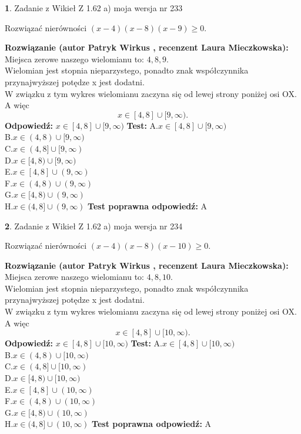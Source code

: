 \documentclass[12pt, a4paper]{article}
\theoremstyle{definition} %
\newtheorem{zad}{}
\newcommand{\zadStart}[1]{\begin{zad}#1\newline}
\newcommand{\zadStop}{\end{zad}}
\newcommand{\rozwStart}[2]{\noindent \textbf{Rozwiązanie (autor #1 , recenzent #2): }\newline}
\newcommand{\rozwStop}{\newline}
\newcommand{\odpStart}{\noindent \textbf{Odpowiedź:}\newline}
\newcommand{\odpStop}{\newline}
\newcommand{\testStart}{\noindent \textbf{Test:}\newline}
\newcommand{\testStop}{\newline}
\newcommand{\kluczStart}{\noindent \textbf{Test poprawna odpowiedź:}\newline}
\newcommand{\kluczStop}{\newline}
\begin{document}
\zadStart{Zadanie z Wikieł Z 1.62 a) moja wersja nr 233}

Rozwiązać nierówności $(x-4)(x-8)(x-9)\ge0$.
\zadStop
\rozwStart{Patryk Wirkus}{Laura Mieczkowska}
Miejsca zerowe naszego wielomianu to: $4, 8, 9$.\\
Wielomian jest stopnia nieparzystego, ponadto znak współczynnika przy\linebreak najwyższej potędze x jest dodatni.\\ W związku z tym wykres wielomianu zaczyna się od lewej strony poniżej osi OX. A więc $$x \in [4,8] \cup [9,\infty).$$
\rozwStop
\odpStart
$x \in [4,8] \cup [9,\infty)$
\odpStop
\testStart
A.$x \in [4,8] \cup [9,\infty)$\\
B.$x \in (4,8) \cup [9,\infty)$\\
C.$x \in (4,8] \cup [9,\infty)$\\
D.$x \in [4,8) \cup [9,\infty)$\\
E.$x \in [4,8] \cup (9,\infty)$\\
F.$x \in (4,8) \cup (9,\infty)$\\
G.$x \in [4,8) \cup (9,\infty)$\\
H.$x \in (4,8] \cup (9,\infty)$
\testStop
\kluczStart
A
\kluczStop



\zadStart{Zadanie z Wikieł Z 1.62 a) moja wersja nr 234}

Rozwiązać nierówności $(x-4)(x-8)(x-10)\ge0$.
\zadStop
\rozwStart{Patryk Wirkus}{Laura Mieczkowska}
Miejsca zerowe naszego wielomianu to: $4, 8, 10$.\\
Wielomian jest stopnia nieparzystego, ponadto znak współczynnika przy\linebreak najwyższej potędze x jest dodatni.\\ W związku z tym wykres wielomianu zaczyna się od lewej strony poniżej osi OX. A więc $$x \in [4,8] \cup [10,\infty).$$
\rozwStop
\odpStart
$x \in [4,8] \cup [10,\infty)$
\odpStop
\testStart
A.$x \in [4,8] \cup [10,\infty)$\\
B.$x \in (4,8) \cup [10,\infty)$\\
C.$x \in (4,8] \cup [10,\infty)$\\
D.$x \in [4,8) \cup [10,\infty)$\\
E.$x \in [4,8] \cup (10,\infty)$\\
F.$x \in (4,8) \cup (10,\infty)$\\
G.$x \in [4,8) \cup (10,\infty)$\\
H.$x \in (4,8] \cup (10,\infty)$
\testStop
\kluczStart
A
\kluczStop
\end{document}
